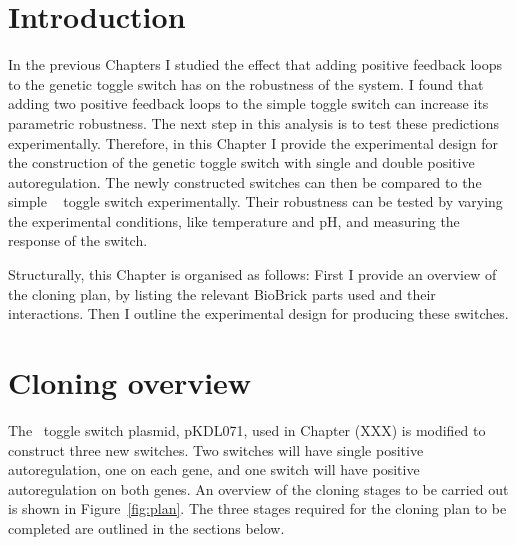 
\section{Introduction}

In the previous Chapters I studied the effect that adding positive feedback loops to the genetic toggle switch has on the robustness of the system. I found that adding two positive feedback loops to the simple toggle switch can increase its parametric robustness. The next step in this analysis is to test these predictions experimentally. Therefore, in this Chapter I provide the experimental design for the construction of the genetic toggle switch with single and double positive autoregulation. The newly constructed switches can then be compared to the simple ~\textcite{Litcofsky:2012gr} toggle switch experimentally. Their robustness can be tested by varying the experimental conditions, like temperature and pH, and measuring the response of the switch.

Structurally, this Chapter is organised as follows: First I provide an overview of the cloning plan, by listing the relevant BioBrick parts used and their interactions. Then I outline the experimental design for producing these switches.


\section{Cloning overview}

The~\textcite{Litcofsky:2012gr} toggle switch plasmid, pKDL071, used in Chapter (XXX) is modified to construct three new switches. Two switches will have single positive autoregulation, one on each gene, and one switch will have positive autoregulation on both genes. An overview of the cloning stages to be carried out is shown in Figure~\ref{fig:plan}. The three stages required for the cloning plan to be completed are outlined in the sections below. 


